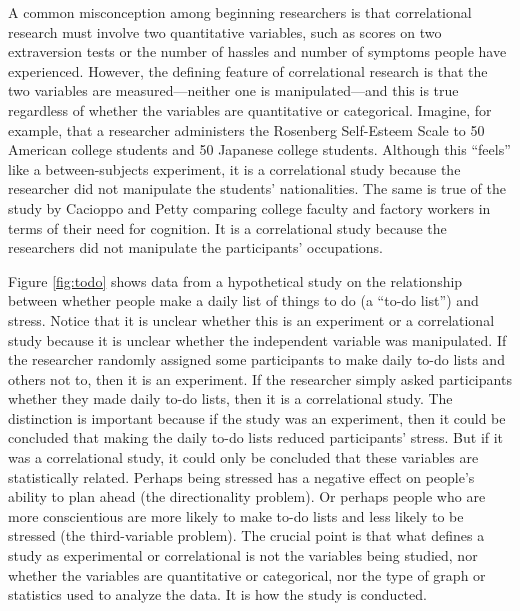 \documentclass[
]{krantz}
\begin{document}
A common misconception among beginning researchers is that correlational research must involve two quantitative variables, such as scores on two extraversion tests or the number of hassles and number of symptoms people have experienced. However, the defining feature of correlational research is that the two variables are measured---neither one is manipulated---and this is true regardless of whether the variables are quantitative or categorical. Imagine, for example, that a researcher administers the Rosenberg Self-Esteem Scale to 50 American college students and 50 Japanese college students. Although this ``feels'' like a between-subjects experiment, it is a correlational study because the researcher did not manipulate the students' nationalities. The same is true of the study by Cacioppo and Petty comparing college faculty and factory workers in terms of their need for cognition. It is a correlational study because the researchers did not manipulate the participants' occupations.

Figure \ref{fig:todo} shows data from a hypothetical study on the relationship between whether people make a daily list of things to do (a ``to-do list'') and stress. Notice that it is unclear whether this is an experiment or a correlational study because it is unclear whether the independent variable was manipulated. If the researcher randomly assigned some participants to make daily to-do lists and others not to, then it is an experiment. If the researcher simply asked participants whether they made daily to-do lists, then it is a correlational study. The distinction is important because if the study was an experiment, then it could be concluded that making the daily to-do lists reduced participants' stress. But if it was a correlational study, it could only be concluded that these variables are statistically related. Perhaps being stressed has a negative effect on people's ability to plan ahead (the directionality problem). Or perhaps people who are more conscientious are more likely to make to-do lists and less likely to be stressed (the third-variable problem). The crucial point is that what defines a study as experimental or correlational is not the variables being studied, nor whether the variables are quantitative or categorical, nor the type of graph or statistics used to analyze the data. It is how the study is conducted.
\end{document}
